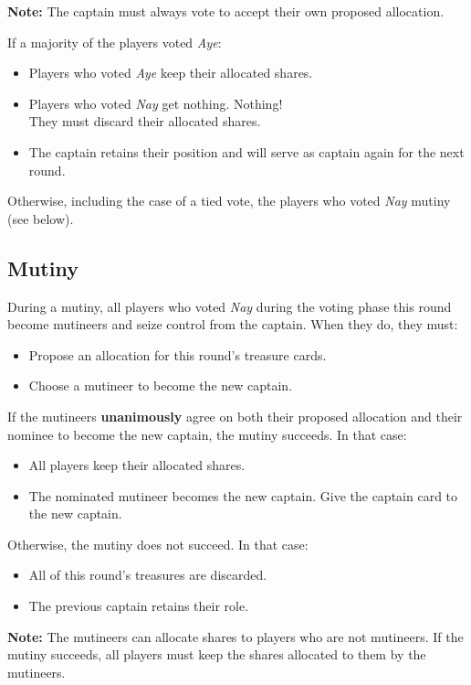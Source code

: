 \textbf{Note:} The captain must always vote to accept their own proposed allocation.

If a majority of the players voted \textit{Aye}:
\begin{itemize}[leftmargin=*]
\item Players who voted \textit{Aye} keep their allocated shares.
\item Players who voted \textit{Nay} get nothing. Nothing!\\They must discard their allocated shares.
\item The captain retains their position and will serve as captain again for the next round.
\end{itemize}

Otherwise, including the case of a tied vote, the players who voted \textit{Nay} mutiny (see below).

\newpage

\subsection*{Mutiny}
During a mutiny, all players who voted \textit{Nay} during the voting phase this round become mutineers and seize control from the captain.
When they do, they must:
\begin{itemize}[leftmargin=*]
\item Propose an allocation for this round's treasure cards.
\item Choose a mutineer to become the new captain.
\end{itemize}

If the mutineers \textbf{unanimously} agree on both their proposed allocation and their nominee to become the new captain, the mutiny succeeds.
In that case:
\begin{itemize}[leftmargin=*]
\item All players keep their allocated shares.
\item The nominated mutineer becomes the new captain. Give the captain card to the new captain.
\end{itemize}

Otherwise, the mutiny does not succeed. In that case:
\begin{itemize}[leftmargin=*]
\item All of this round's treasures are discarded.
\item The previous captain retains their role.
\end{itemize}

\textbf{Note:} The mutineers can allocate shares to players who are not mutineers. If the mutiny succeeds, all players must keep the shares allocated to them by the mutineers.
